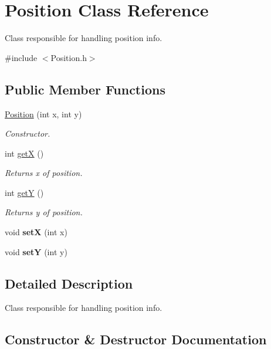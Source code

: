 \hypertarget{classPosition}{}\section{Position Class Reference}
\label{classPosition}


Class responsible for handling position info.  




{\ttfamily \#include $<$Position.\+h$>$}

\subsection*{Public Member Functions}
\begin{DoxyCompactItemize}
\item 
\hyperlink{classPosition_a6e36cf0fee251e74cfedb86f4e99558d}{Position} (int x, int y)
\begin{DoxyCompactList}\small\item\em Constructor. \end{DoxyCompactList}\item 
int \hyperlink{classPosition_a4e65d4b865c08791302956e2912a2300}{getX} ()
\begin{DoxyCompactList}\small\item\em Returns x of position. \end{DoxyCompactList}\item 
int \hyperlink{classPosition_ab386f9a955ea2e291774f8d403614260}{getY} ()
\begin{DoxyCompactList}\small\item\em Returns y of position. \end{DoxyCompactList}\item 
\mbox{\label{classPosition_ad46bb77324e2d9538e15f1a25320f1ff}} 
void {\bfseries setX} (int x)
\item 
\mbox{\label{classPosition_a473274f1a3e4888f9c5e3eba0889a1ab}} 
void {\bfseries setY} (int y)
\end{DoxyCompactItemize}


\subsection{Detailed Description}
Class responsible for handling position info. 

\subsection{Constructor \& Destructor Documentation}
\mbox{\label{classPosition_a6e36cf0fee251e74cfedb86f4e99558d}} 
